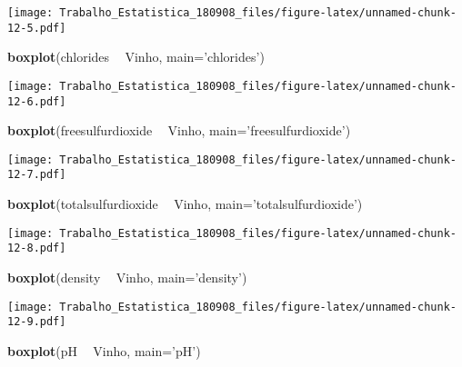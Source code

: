 \documentclass[]{article}
\newenvironment{Shaded}{\begin{snugshade}}{\end{snugshade}}
\newcommand{\KeywordTok}[1]{\textcolor[rgb]{0.13,0.29,0.53}{\textbf{#1}}}
\newcommand{\DataTypeTok}[1]{\textcolor[rgb]{0.13,0.29,0.53}{#1}}
\newcommand{\StringTok}[1]{\textcolor[rgb]{0.31,0.60,0.02}{#1}}
\newcommand{\OperatorTok}[1]{\textcolor[rgb]{0.81,0.36,0.00}{\textbf{#1}}}
\newcommand{\NormalTok}[1]{#1}
\begin{document}
\texttt{[image: Trabalho\_Estatistica\_180908\_files/figure-latex/unnamed-chunk-12-5.pdf]}

\begin{Shaded}
\begin{Highlighting}[]
\KeywordTok{boxplot}\NormalTok{(chlorides }\OperatorTok{~}\StringTok{ }\NormalTok{Vinho, }\DataTypeTok{main=}\StringTok{'chlorides'}\NormalTok{)}
\end{Highlighting}
\end{Shaded}

\texttt{[image: Trabalho\_Estatistica\_180908\_files/figure-latex/unnamed-chunk-12-6.pdf]}

\begin{Shaded}
\begin{Highlighting}[]
\KeywordTok{boxplot}\NormalTok{(freesulfurdioxide }\OperatorTok{~}\StringTok{ }\NormalTok{Vinho, }\DataTypeTok{main=}\StringTok{'freesulfurdioxide'}\NormalTok{)}
\end{Highlighting}
\end{Shaded}

\texttt{[image: Trabalho\_Estatistica\_180908\_files/figure-latex/unnamed-chunk-12-7.pdf]}

\begin{Shaded}
\begin{Highlighting}[]
\KeywordTok{boxplot}\NormalTok{(totalsulfurdioxide }\OperatorTok{~}\StringTok{ }\NormalTok{Vinho, }\DataTypeTok{main=}\StringTok{'totalsulfurdioxide'}\NormalTok{)}
\end{Highlighting}
\end{Shaded}

\texttt{[image: Trabalho\_Estatistica\_180908\_files/figure-latex/unnamed-chunk-12-8.pdf]}

\begin{Shaded}
\begin{Highlighting}[]
\KeywordTok{boxplot}\NormalTok{(density }\OperatorTok{~}\StringTok{ }\NormalTok{Vinho, }\DataTypeTok{main=}\StringTok{'density'}\NormalTok{)}
\end{Highlighting}
\end{Shaded}

\texttt{[image: Trabalho\_Estatistica\_180908\_files/figure-latex/unnamed-chunk-12-9.pdf]}

\begin{Shaded}
\begin{Highlighting}[]
\KeywordTok{boxplot}\NormalTok{(pH }\OperatorTok{~}\StringTok{ }\NormalTok{Vinho, }\DataTypeTok{main=}\StringTok{'pH'}\NormalTok{)}
\end{Highlighting}
\end{Shaded}
\end{document}
